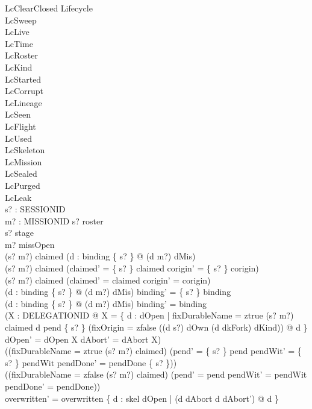 \documentclass[a4paper,10pt,fleqn]{article}
\begin{document}
\begin{schema}{LcClearClosed}
\Delta Lifecycle \\
\Xi LcSweep \\
\Xi LcLive \\
\Xi LcTime \\
\Xi LcRoster \\
\Xi LcKind \\
\Xi LcStarted \\
\Xi LcCorrupt \\
\Xi LcLineage \\
\Xi LcSeen \\
\Xi LcFlight \\
\Xi LcUsed \\
\Xi LcSkeleton \\
\Xi LcMission \\
\Xi LcSealed \\
\Xi LcPurged \\
\Xi LcLeak \\
s? : SESSIONID \\
m? : MISSIONID
\where
s? \in roster \\
s? \notin \dom stage \\
m? \notin missOpen \\
(s? \mapsto m?) \in claimed \lor (\exists d : binding \limg \{ s? \} \rimg @ (d \mapsto m?) \in dMis) \\
(s? \mapsto m?) \in claimed \implies (claimed' = \{ s? \} \ndres claimed \land corigin' = \{ s? \} \ndres corigin) \\
(s? \mapsto m?) \notin claimed \implies (claimed' = claimed \land corigin' = corigin) \\
(\exists d : binding \limg \{ s? \} \rimg @ (d \mapsto m?) \in dMis) \implies binding' = \{ s? \} \ndres binding \\
\lnot (\exists d : binding \limg \{ s? \} \rimg @ (d \mapsto m?) \in dMis) \implies binding' = binding \\
(\exists X : \power DELEGATIONID @ X = \{ d : dOpen | fixDurableName = ztrue \land (s? \mapsto m?) \in claimed \land d \in pend \limg \{ s? \} \rimg \land (fixOrigin = zfalse \lor ((d \mapsto s?) \in dOwn \land (d \mapsto dkFork) \in dKind)) @ d \} \land dOpen' = dOpen \setminus X \land dAbort' = dAbort \cup X) \\
((fixDurableName = ztrue \land (s? \mapsto m?) \in claimed) \implies (pend' = \{ s? \} \ndres pend \land pendWit' = \{ s? \} \ndres pendWit \land pendDone' = pendDone \setminus \{ s? \})) \\
((fixDurableName = zfalse \lor (s? \mapsto m?) \notin claimed) \implies (pend' = pend \land pendWit' = pendWit \land pendDone' = pendDone)) \\
overwritten' = overwritten \cup \{ d : skel \setminus dOpen | (d \in dAbort \iff d \notin dAbort') @ d \}
\end{schema}
\end{document}
